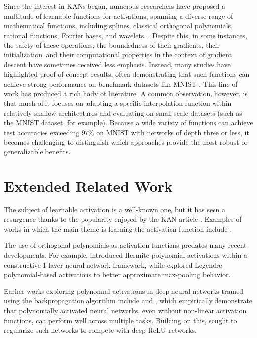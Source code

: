 \documentclass{article} %
\theoremstyle{plain}
\theoremstyle{definition}
\theoremstyle{remark}
\begin{document}
Since the interest in KANs began, numerous researchers have proposed a multitude of learnable functions for activations, spanning a diverse range of mathematical functions, including splines, classical orthogonal polynomials, rational functions, Fourier bases, and wavelets... Despite this, in some instances, the safety of these operations, the boundedness of their gradients, their initialization, and their computational properties in the context of gradient descent have sometimes received less emphasis. Instead, many studies have highlighted proof-of-concept results, often demonstrating that such functions can achieve strong performance on benchmark datasets like MNIST \cite{lecun1998mnist}. This line of work has produced a rich body of literature. A common observation, however, is that much of it focuses on adapting a specific interpolation function within relatively shallow architectures and evaluating on small-scale datasets (such as the MNIST dataset, for example). Because a wide variety of functions can achieve test accuracies exceeding 97\% on MNIST with networks of depth three or less, it becomes challenging to distinguish which approaches provide the most robust or generalizable benefits.

\section{Extended Related Work}
\label{appendix:related}
The subject of learnable activation is a well-known one, but it has seen a resurgence thanks to the popularity enjoyed by the KAN article \cite{liu2025kan}. Examples of works in which the main theme is learning the activation function include \cite{houlsby2019parameter, goyal2019learning, tavakoli2021splash, moosavi2022adaptable, fang2023transformers, bodyanskiy2023learnable, pishchik2023trainable}.

The use of orthogonal polynomials as activation functions predates many recent developments. For example, \citet{ma2005constructive} introduced Hermite polynomial activations within a constructive 1-layer neural network framework, while \citet{venkatappareddy2021legendre} explored Legendre polynomial-based activations to better approximate max-pooling behavior.

Earlier works exploring polynomial activations in deep neural networks trained using the backpropagation algorithm include \cite{zhou2019polynomial} and \cite{chrysos2020p}, which empirically demonstrate that polynomially activated neural networks, even without non-linear activation functions, can perform well across multiple tasks. Building on this, \cite{chrysos2023regularization} sought to regularize such networks to compete with deep ReLU networks.
\end{document}
